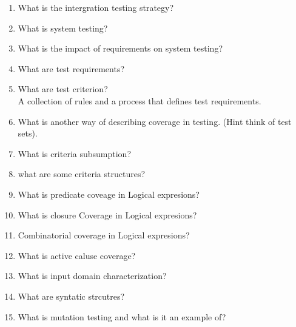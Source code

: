 \documentclass[10pt]{article}
\begin{document}
\begin{enumerate}
    \item What is the intergration testing strategy?\\

    \item What is system testing?\\

    \item What is the impact of requirements on system testing?\\

    \item What are test requirements?\\

    \item What are test criterion?\\
          A collection of rules and a process that defines test requirements.\\

    \item What is another way of describing coverage in testing. (Hint think of test sets).\\

    \item What is criteria subsumption?

    \item what are some criteria structures?\\

    \item What is predicate coveage in Logical expresions?\\

    \item What is closure Coverage in Logical expresions?\\

    \item Combinatorial coverage in Logical expresions?\\

    \item What is active caluse coverage?\\

    \item What is input domain characterization?\\
    \item What are syntatic strcutres?\\

    \item What is mutation testing and what is it an example of?\\


\end{enumerate}
\end{document}
